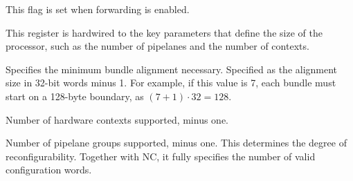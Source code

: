 \implementation{}

\reset{*}
This flag is set when forwarding is enabled.

\implementation{}


This register is hardwired to the key parameters that define the size of the
processor, such as the number of pipelanes and the number of contexts.

\reset{****}
Specifies the minimum bundle alignment necessary. Specified as the alignment
size in 32-bit words minus 1. For example, if this value is 7, each bundle must
start on a 128-byte boundary, as $(7 + 1) \cdot 32 = 128$.

\implementation{}

\reset{****}
Number of hardware contexts supported, minus one.

\implementation{}

\reset{****}
Number of pipelane groups supported, minus one. This determines the degree of
reconfigurability. Together with NC, it fully specifies the number of valid
configuration words.

\implementation{}

